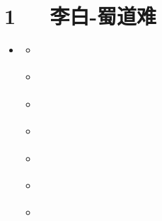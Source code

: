 \documentclass[letterpaper,10pt,english]{sphinxmanual}
\begin{document}
\chapter{1   李白-蜀道难}
\label{\detokenize{p01_u6563_u6587/_u674e_u767d-_u8700_u9053_u96be:id1}}\label{\detokenize{p01_u6563_u6587/_u674e_u767d-_u8700_u9053_u96be::doc}}
\begin{sphinxShadowBox}
\begin{itemize}
\item {} 
\label{\detokenize{p01_u6563_u6587/_u674e_u767d-_u8700_u9053_u96be:id10}}{\hyperref[\detokenize{p01_u6563_u6587/_u674e_u767d-_u8700_u9053_u96be:id1}]{}}
\begin{itemize}
\item {} 
\label{\detokenize{p01_u6563_u6587/_u674e_u767d-_u8700_u9053_u96be:id11}}{\hyperref[\detokenize{p01_u6563_u6587/_u674e_u767d-_u8700_u9053_u96be:id3}]{}}

\item {} 
\label{\detokenize{p01_u6563_u6587/_u674e_u767d-_u8700_u9053_u96be:id12}}{\hyperref[\detokenize{p01_u6563_u6587/_u674e_u767d-_u8700_u9053_u96be:id4}]{}}

\item {} 
\label{\detokenize{p01_u6563_u6587/_u674e_u767d-_u8700_u9053_u96be:id13}}{\hyperref[\detokenize{p01_u6563_u6587/_u674e_u767d-_u8700_u9053_u96be:id5}]{}}

\item {} 
\label{\detokenize{p01_u6563_u6587/_u674e_u767d-_u8700_u9053_u96be:id14}}{\hyperref[\detokenize{p01_u6563_u6587/_u674e_u767d-_u8700_u9053_u96be:id6}]{}}

\item {} 
\label{\detokenize{p01_u6563_u6587/_u674e_u767d-_u8700_u9053_u96be:id15}}{\hyperref[\detokenize{p01_u6563_u6587/_u674e_u767d-_u8700_u9053_u96be:id7}]{}}

\item {} 
\label{\detokenize{p01_u6563_u6587/_u674e_u767d-_u8700_u9053_u96be:id16}}{\hyperref[\detokenize{p01_u6563_u6587/_u674e_u767d-_u8700_u9053_u96be:id8}]{}}

\item {} 
\label{\detokenize{p01_u6563_u6587/_u674e_u767d-_u8700_u9053_u96be:id17}}{\hyperref[\detokenize{p01_u6563_u6587/_u674e_u767d-_u8700_u9053_u96be:id9}]{}}

\end{itemize}

\end{itemize}
\end{sphinxShadowBox}
\end{document}
